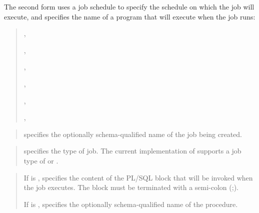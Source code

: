 \documentclass[letterpaper,10pt,english,openany,oneside]{sphinxmanual}
\begin{document}
The second form uses a job schedule to specify the schedule on which the
job will execute, and specifies the name of a program that will execute
when the job runs:
\begin{quote}

\begin{DUlineblock}{0em}
\item[] 
\item[] ,
\item[] ,
\item[] ,
\item[] ,
\item[] ,
\item[] ,
\item[] 
\end{DUlineblock}
\end{quote}


\begin{quote}

 specifies the optionally schema-qualified name of the
job being created.
\end{quote}

\begin{quote}

 specifies the type of job. The current implementation of
 supports a job type of  or
.
\end{quote}

\begin{quote}

If  is ,  specifies the content
of the PL/SQL block that will be invoked when the job executes. The
block must be terminated with a semi-colon (;).

If  is ,  specifies the
optionally schema-qualified name of the procedure.
\end{quote}
\end{document}
